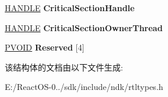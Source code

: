 \begin{DoxyCompactItemize}
\item 
\mbox{\label{struct___r_t_l___d_e_b_u_g___i_n_f_o_r_m_a_t_i_o_n_a43c1fb557d8670d008972fe714d47962}} 
\hyperlink{interfacevoid}{H\+A\+N\+D\+LE} {\bfseries Critical\+Section\+Handle}
\item 
\mbox{\label{struct___r_t_l___d_e_b_u_g___i_n_f_o_r_m_a_t_i_o_n_abca45e01e0aebf1022bd5060bfdca337}} 
\hyperlink{interfacevoid}{H\+A\+N\+D\+LE} {\bfseries Critical\+Section\+Owner\+Thread}
\item 
\mbox{\label{struct___r_t_l___d_e_b_u_g___i_n_f_o_r_m_a_t_i_o_n_ae7bdead594b23c60949365db48d3d16a}} 
\hyperlink{interfacevoid}{P\+V\+O\+ID} {\bfseries Reserved} \mbox{[}4\mbox{]}
\end{DoxyCompactItemize}


该结构体的文档由以下文件生成\+:\begin{DoxyCompactItemize}
\item 
E\+:/\+React\+O\+S-\/0../sdk/include/ndk/rtltypes.\+h\end{DoxyCompactItemize}
